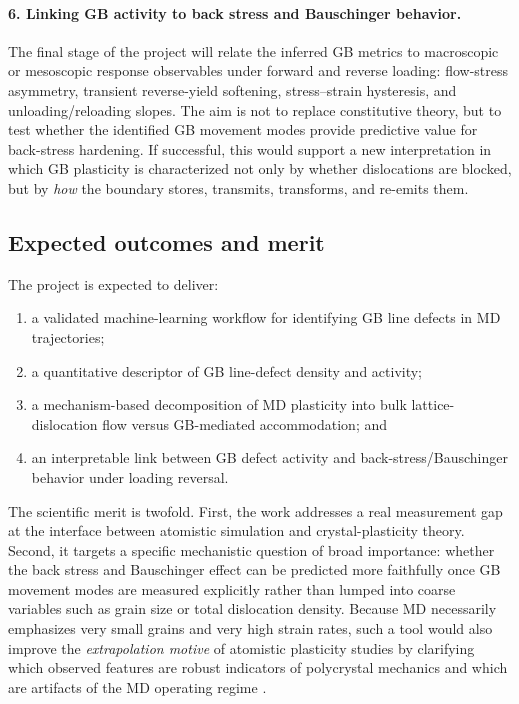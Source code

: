 \paragraph{6. Linking GB activity to back stress and Bauschinger behavior.}
The final stage of the project will relate the inferred GB metrics to macroscopic or mesoscopic response observables under forward and reverse loading: flow-stress asymmetry, transient reverse-yield softening, stress--strain hysteresis, and unloading/reloading slopes. The aim is not to replace constitutive theory, but to test whether the identified GB movement modes provide predictive value for back-stress hardening. If successful, this would support a new interpretation in which GB plasticity is characterized not only by whether dislocations are blocked, but by \emph{how} the boundary stores, transmits, transforms, and re-emits them.

\subsection*{Expected outcomes and merit}
The project is expected to deliver:
\begin{enumerate}
    \item a validated machine-learning workflow for identifying GB line defects in MD trajectories;
    \item a quantitative descriptor of GB line-defect density and activity;
    \item a mechanism-based decomposition of MD plasticity into bulk lattice-dislocation flow versus GB-mediated accommodation; and
    \item an interpretable link between GB defect activity and back-stress/Bauschinger behavior under loading reversal.
\end{enumerate}

The scientific merit is twofold. First, the work addresses a real measurement gap at the interface between atomistic simulation and crystal-plasticity theory. Second, it targets a specific mechanistic question of broad importance: whether the back stress and Bauschinger effect can be predicted more faithfully once GB movement modes are measured explicitly rather than lumped into coarse variables such as grain size or total dislocation density. Because MD necessarily emphasizes very small grains and very high strain rates, such a tool would also improve the \emph{extrapolation motive} of atomistic plasticity studies by clarifying which observed features are robust indicators of polycrystal mechanics and which are artifacts of the MD operating regime \cite{Materials2020,Huang2019}.

